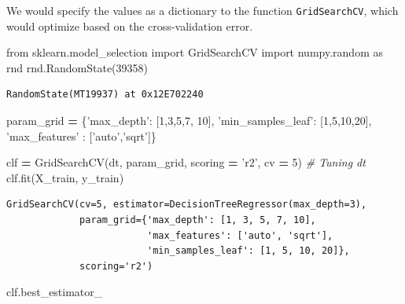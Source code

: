 \documentclass[
  letterpaper,
]{scrbook}
\newenvironment{Shaded}{\begin{snugshade}}{\end{snugshade}}
\newcommand{\CommentTok}[1]{\textcolor[rgb]{0.56,0.35,0.01}{\textit{#1}}}
\newcommand{\DecValTok}[1]{\textcolor[rgb]{0.00,0.00,0.81}{#1}}
\newcommand{\ImportTok}[1]{#1}
\newcommand{\NormalTok}[1]{#1}
\newcommand{\OperatorTok}[1]{\textcolor[rgb]{0.81,0.36,0.00}{\textbf{#1}}}
\newcommand{\StringTok}[1]{\textcolor[rgb]{0.31,0.60,0.02}{#1}}
\begin{document}
We would specify the values as a dictionary to the function \texttt{GridSearchCV}, which would optimize based on the cross-validation error.

\begin{Shaded}
\begin{Highlighting}[]
\ImportTok{from}\NormalTok{ sklearn.model_selection }\ImportTok{import}\NormalTok{ GridSearchCV}
\ImportTok{import}\NormalTok{ numpy.random }\ImportTok{as}\NormalTok{ rnd}
\NormalTok{rnd.RandomState(}\DecValTok{39358}\NormalTok{)}
\end{Highlighting}
\end{Shaded}

\begin{verbatim}
RandomState(MT19937) at 0x12E702240
\end{verbatim}

\begin{Shaded}
\begin{Highlighting}[]
\NormalTok{param_grid }\OperatorTok{=}\NormalTok{ \{}\StringTok{'max_depth'}\NormalTok{: [}\DecValTok{1}\NormalTok{,}\DecValTok{3}\NormalTok{,}\DecValTok{5}\NormalTok{,}\DecValTok{7}\NormalTok{, }\DecValTok{10}\NormalTok{], }\StringTok{'min_samples_leaf'}\NormalTok{: [}\DecValTok{1}\NormalTok{,}\DecValTok{5}\NormalTok{,}\DecValTok{10}\NormalTok{,}\DecValTok{20}\NormalTok{],}
  \StringTok{'max_features'}\NormalTok{ : [}\StringTok{'auto'}\NormalTok{,}\StringTok{'sqrt'}\NormalTok{]\}}

\NormalTok{clf }\OperatorTok{=}\NormalTok{ GridSearchCV(dt, param_grid, scoring }\OperatorTok{=} \StringTok{'r2'}\NormalTok{, cv }\OperatorTok{=} \DecValTok{5}\NormalTok{) }\CommentTok{# Tuning dt}
\NormalTok{clf.fit(X_train, y_train)}
\end{Highlighting}
\end{Shaded}

\begin{verbatim}
GridSearchCV(cv=5, estimator=DecisionTreeRegressor(max_depth=3),
             param_grid={'max_depth': [1, 3, 5, 7, 10],
                         'max_features': ['auto', 'sqrt'],
                         'min_samples_leaf': [1, 5, 10, 20]},
             scoring='r2')
\end{verbatim}

\begin{Shaded}
\begin{Highlighting}[]
\NormalTok{clf.best_estimator_}
\end{Highlighting}
\end{Shaded}
\end{document}

